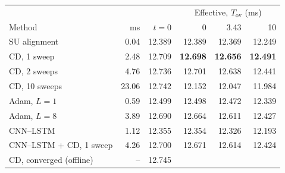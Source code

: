 \begin{tabular}{lrr|rrr}
\toprule
 & & & \multicolumn{3}{c}{Effective, $T_{\mathrm{ov}}$ (ms)} \\
Method & ms & $t{=}0$ & 0 & 3.43 & 10 \\
\midrule
SU alignment & 0.04 & 12.389 & 12.389 & 12.369 & 12.249 \\
CD, 1 sweep & 2.48 & 12.709 & \textbf{12.698} & \textbf{12.656} & \textbf{12.491} \\
CD, 2 sweeps & 4.76 & 12.736 & 12.701 & 12.638 & 12.441 \\
CD, 10 sweeps & 23.06 & 12.742 & 12.152 & 12.047 & 11.984 \\
Adam, $L{=}1$ & 0.59 & 12.499 & 12.498 & 12.472 & 12.339 \\
Adam, $L{=}8$ & 3.89 & 12.690 & 12.664 & 12.611 & 12.427 \\
CNN--LSTM & 1.12 & 12.355 & 12.354 & 12.326 & 12.193 \\
CNN--LSTM + CD, 1 sweep & 4.26 & 12.700 & 12.671 & 12.614 & 12.424 \\
\midrule
CD, converged (offline) & -- & 12.745 & & & \\
\bottomrule
\end{tabular}
